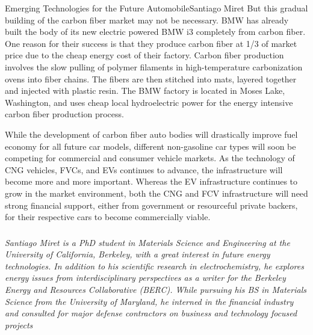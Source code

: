 \documentclass{papertex}
\begin{document}
\begin{news}{2}{Emerging Technologies for the Future Automobile}{Santiago Miret}{}{}
But this gradual building of the carbon fiber market may not be necessary. BMW
has already built the body of its new electric powered BMW i3 completely from
carbon fiber. One reason for their success is that they produce carbon fiber at
1/3 of market price due to the cheap energy cost of their factory. Carbon fiber
production involves the slow pulling of polymer filaments in high-temperature
carbonization ovens into fiber chains. The fibers are then stitched into mats,
layered together and injected with plastic resin. The BMW factory is located in
Moses Lake, Washington, and uses cheap local hydroelectric power for the energy
intensive carbon fiber production process.

While the development of carbon fiber auto bodies will drastically improve fuel
economy for all future car models, different non-gasoline car types will soon be
competing for commercial and consumer vehicle markets. As the technology of CNG
vehicles, FVCs, and EVs continues to advance, the infrastructure will become
more and more important. Whereas the EV infrastructure continues to grow in the
market environment, both the CNG and FCV infrastructure will need strong
financial support, either from government or resourceful private backers, for
their respective cars to become commercially viable.

\subsubsection*{}

\emph{Santiago Miret is a PhD student in Materials Science and Engineering at
the University of California, Berkeley, with a great interest in future energy
technologies. In addition to his scientific research in electrochemistry, he
explores energy issues from interdisciplinary perspectives as a writer for the
Berkeley Energy and Resources Collaborative (BERC). While pursuing his BS in
Materials Science from the University of Maryland, he interned in the financial
industry and consulted for major defense contractors on business and technology
focused projects}

\end{news}
\end{document}
